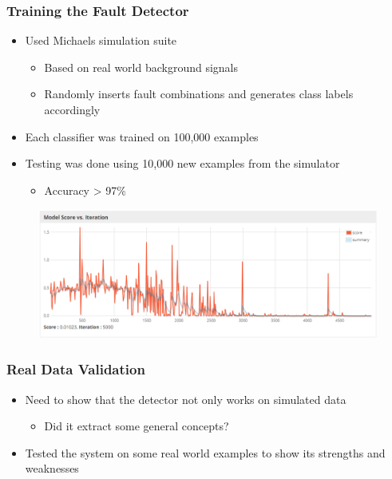 \begin{frame}
  \frametitle{Training the Fault Detector}
  \begin{itemize}
    \item Used Michaels simulation suite
      \begin{itemize}
        \item Based on real world background signals
        \item Randomly inserts fault combinations and generates class labels
          accordingly
      \end{itemize}
    \item Each classifier was trained on 100,000 examples
    \item Testing was done using 10,000 new examples from the
      simulator
      \begin{itemize}
        \item Accuracy > 97\%
      \end{itemize}
  \end{itemize}
  \begin{figure}
    \includegraphics[width=.85\textwidth]{../figures/learning_curve}
  \end{figure}
\end{frame}

\begin{frame}
  \frametitle{Real Data Validation}
  \begin{itemize}
    \item Need to show that the detector not only works on simulated
      data
      \begin{itemize}
        \item Did it extract some general concepts?
      \end{itemize}
    \item Tested the system on some real world examples to show its
      strengths and weaknesses
  \end{itemize}
\end{frame}

